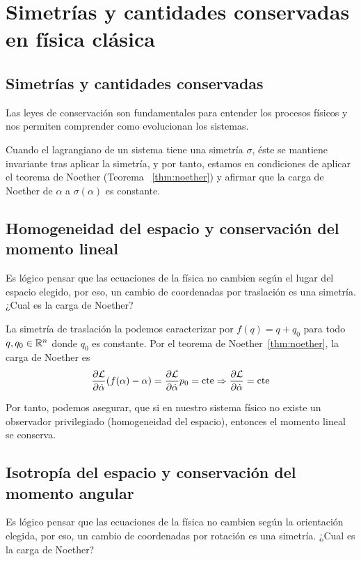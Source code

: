 \chapter{Simetrías y cantidades conservadas en física clásica}\label{ch:simetrias-y-cantidades-conservadas-en-fisica-clasica}

\section{Simetrías y cantidades conservadas}\label{sec:simetrias-y-cantidades-conservadas}

Las leyes de conservación son fundamentales para entender los procesos físicos y nos permiten comprender como evolucionan los sistemas.

Cuando el lagrangiano de un sistema tiene una simetría $\sigma$, éste se mantiene invariante tras aplicar la simetría, y por tanto, estamos en condiciones de aplicar el teorema de Noether (Teorema ~\eqref{thm:noether}) y afirmar que la carga de Noether de $\alpha$ a $\sigma(\alpha)$ es constante.

\section{Homogeneidad del espacio y conservación del momento lineal}\label{sec:homogeneidad-del-espacio-y-conservacion-del-momento-lineal}
Es lógico pensar que las ecuaciones de la física no cambien según el lugar del espacio elegido, por eso, un cambio de coordenadas por traslación es una simetría.
¿Cual es la carga de Noether?

La simetría de traslación la podemos caracterizar por $f(q)=q+q_0$ para todo $q, q_0\in\mathbb{R}^n$ donde $q_0$ es constante.
Por el teorema de Noether~\eqref{thm:noether}, la carga de Noether es
\begin{equation}
	\label{eq:conservacion_momento_lineal}
	\frac{\partial \mathcal{L}}{\partial\dot{\alpha}}(f(\alpha)-\alpha) = \frac{\partial \mathcal{L}}{\partial\dot{\alpha}}p_0=\text{cte}\Rightarrow\frac{\partial \mathcal{L}}{\partial\dot{\alpha}}=\text{cte}
\end{equation}

Por tanto, podemos asegurar, que si en nuestro sistema físico no existe un observador privilegiado (homogeneidad del espacio), entonces el momento lineal se conserva.

\section{Isotropía del espacio y conservación del momento angular}\label{sec:isotropia-del-espacio-y-conservacion-del-momento-angular}
Es lógico pensar que las ecuaciones de la física no cambien según la orientación elegida, por eso, un cambio de coordenadas por rotación es una simetría.
¿Cual es la carga de Noether?


